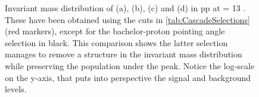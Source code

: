 \begin{figure}[t]
\hspace*{-1.5cm}
\hspace*{-1.5cm}	
	\caption{Invariant mass distribution of \rmXiM (a), \rmAxiP (b), \rmOmegaM (c) and \rmAomegaP (d) in pp at \sqrtS = 13 \tev. These have been obtained using the cuts in \tab\ref{tab:CascadeSelections} (red markers), except for the bachelor-proton pointing angle selection in black. This comparison shows the latter selection manages to remove a structure in the invariant mass distribution while preserving the population under the peak. Notice the log-scale on the y-axis, that puts into perspective the signal and background levels.}
	\label{fig:WrongPA}
\end{figure}

